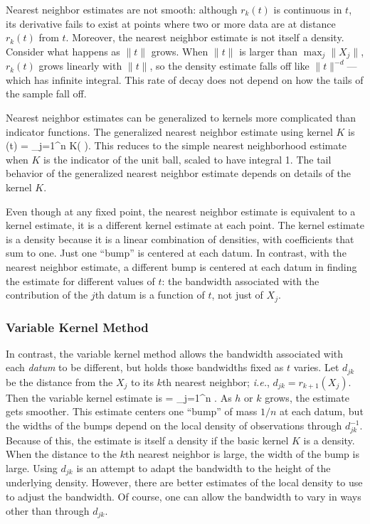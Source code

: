 Nearest neighbor estimates are not smooth: although $r_k(t)$ is continuous in
$t$, its derivative fails to exist at points where two or more data
are at distance $r_k(t)$ from $t$.
Moreover, the nearest neighbor estimate is not itself a density.
Consider what happens as $\|t\|$ grows.
When $\|t\|$ is larger than $\max_j \| X_j \|$,
$r_k(t)$ grows linearly with $\|t\|$,
so the density estimate falls off like $\|t\|^{-d}$---which has infinite
integral.
This rate of decay does not depend on how the tails of the sample
fall off.

Nearest neighbor estimates can be generalized to kernels more complicated
than indicator functions.
The generalized nearest neighbor estimate using kernel $K$ is
\beq
    (t) =  \sum_{j=1}^n K\left (  \right ).
\eeq
This reduces to the simple nearest neighborhood estimate when $K$ is the indicator
of the unit ball, scaled to have integral 1.
The tail behavior of the generalized nearest neighbor estimate depends on
details of the kernel $K$.

Even though at any fixed point, the nearest neighbor estimate is equivalent to
a kernel estimate, it is a different kernel estimate at each point.
The kernel estimate is a density because it is a linear combination of
densities, with coefficients that sum to one.
Just one ``bump'' is centered at each datum.
In contrast, with the nearest neighbor estimate, a different bump is centered at
each datum in finding the estimate for different values of $t$: the bandwidth
associated with the
contribution of the $j$th datum is a function of $t$, not just of $X_j$.

\subsubsection{Variable Kernel Method}
In contrast, the variable kernel method allows the bandwidth associated with
each {\em datum\/} to be different, but holds those bandwidths fixed as
$t$ varies.
Let $d_{jk}$ be the distance from the $X_j$ to its $k$th nearest neighbor; {\em i.e.\/},
$d_{jk} = r_{k+1}(X_j)$.
Then the variable kernel estimate is
\beq
     =  \sum_{j=1}^n
        .
\eeq
As $h$ or $k$ grows, the estimate gets smoother.
This estimate centers one ``bump'' of mass $1/n$ at each datum, but the widths of the
bumps depend on the local density of observations through $d_{jk}^{-1}$.
Because of this, the estimate is itself a density if the basic kernel $K$ is a density.
When the distance to the $k$th nearest neighbor is large, the width of the bump is large.
Using $d_{jk}$ is an attempt to adapt the bandwidth to the height of the underlying
density.
However, there are better estimates of the local density to use to adjust the
bandwidth.
Of course, one can allow the bandwidth to vary in ways other than through
$d_{jk}$.

